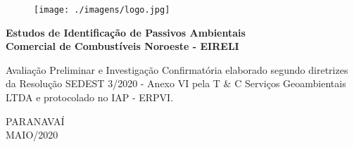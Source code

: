 \thispagestyle{empty}
\begin{figure}[t]
	\centering
	\texttt{[image: ./imagens/logo.jpg]}
\end{figure}
\mbox{} 
\vspace{6.5cm}

\begin{center}
	{\Large \bfseries
		Estudos de Identificação de Passivos Ambientais\\ 
		Comercial de Combustíveis Noroeste - EIRELI }
\end{center}

\vfill

\begin{flushright}
	\begin{minipage}[h]{8cm}
		{\footnotesize {Avaliação Preliminar e Investigação Confirmatória elaborado segundo diretrizes da Resolução SEDEST 3/2020 - Anexo VI pela T \& C Serviços Geoambientais LTDA e protocolado no IAP - ERPVI.}}
	\end{minipage}
\end{flushright}

\vfill

\begin{center}
{\large 
{PARANAVAÍ\\
MAIO/2020}
}
\end{center}
\newpage

